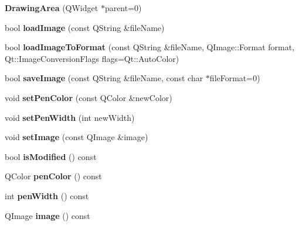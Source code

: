 \begin{DoxyCompactItemize}
\item 
\hypertarget{class_drawing_area_a95168b77c2ff299f898fd0966aa21fd6}{
{\bfseries DrawingArea} (QWidget $\ast$parent=0)}
\label{class_drawing_area_a95168b77c2ff299f898fd0966aa21fd6}

\item 
\hypertarget{class_drawing_area_a2b76b7e68078ea3a1e701b7980a69ca4}{
bool {\bfseries loadImage} (const QString \&fileName)}
\label{class_drawing_area_a2b76b7e68078ea3a1e701b7980a69ca4}

\item 
\hypertarget{class_drawing_area_a248f3386042312f1212edf377db79b6a}{
bool {\bfseries loadImageToFormat} (const QString \&fileName, QImage::Format format, Qt::ImageConversionFlags flags=Qt::AutoColor)}
\label{class_drawing_area_a248f3386042312f1212edf377db79b6a}

\item 
\hypertarget{class_drawing_area_a7a67f8783c4cd8617d3654723930c33b}{
bool {\bfseries saveImage} (const QString \&fileName, const char $\ast$fileFormat=0)}
\label{class_drawing_area_a7a67f8783c4cd8617d3654723930c33b}

\item 
\hypertarget{class_drawing_area_afe42bde48cab8cefce39df6c6baffceb}{
void {\bfseries setPenColor} (const QColor \&newColor)}
\label{class_drawing_area_afe42bde48cab8cefce39df6c6baffceb}

\item 
\hypertarget{class_drawing_area_ad79225ca90fc7d2bb3218f00fe3a1af1}{
void {\bfseries setPenWidth} (int newWidth)}
\label{class_drawing_area_ad79225ca90fc7d2bb3218f00fe3a1af1}

\item 
\hypertarget{class_drawing_area_ac1835de69cdb754fc8043974c4f583ac}{
void {\bfseries setImage} (const QImage \&image)}
\label{class_drawing_area_ac1835de69cdb754fc8043974c4f583ac}

\item 
\hypertarget{class_drawing_area_a727f9acc4083f97aa439eb6a6cb57adc}{
bool {\bfseries isModified} () const }
\label{class_drawing_area_a727f9acc4083f97aa439eb6a6cb57adc}

\item 
\hypertarget{class_drawing_area_a666bda2b4d8fc9bf5ea726f7c4b66df0}{
QColor {\bfseries penColor} () const }
\label{class_drawing_area_a666bda2b4d8fc9bf5ea726f7c4b66df0}

\item 
\hypertarget{class_drawing_area_a2fbaa03b53f44c06190f72e6aad4f5fa}{
int {\bfseries penWidth} () const }
\label{class_drawing_area_a2fbaa03b53f44c06190f72e6aad4f5fa}

\item 
\hypertarget{class_drawing_area_ab90b3a2a7e86bb93fd74513c803fd706}{
QImage {\bfseries image} () const }
\label{class_drawing_area_ab90b3a2a7e86bb93fd74513c803fd706}

\end{DoxyCompactItemize}
